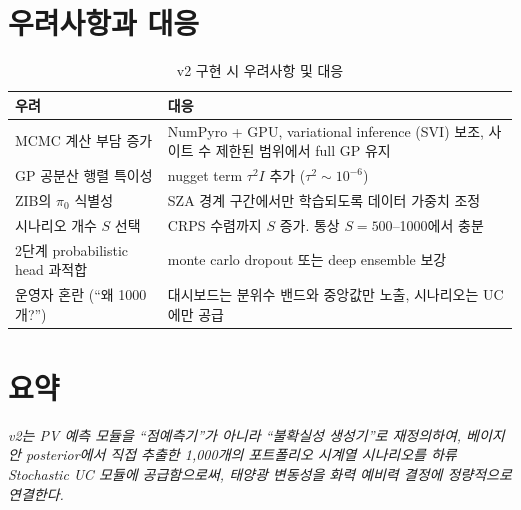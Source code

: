 \documentclass[11pt,a4paper]{article}
\begin{document}
\section{우려사항과 대응}

\begin{table}[H]
\centering
\small
\caption{v2 구현 시 우려사항 및 대응}
\begin{tabular}{p{4cm}p{9.5cm}}
\toprule
우려 & 대응 \\
\midrule
MCMC 계산 부담 증가 & NumPyro + GPU, variational inference (SVI) 보조, 사이트 수 제한된 범위에서 full GP 유지 \\
GP 공분산 행렬 특이성 & nugget term $\tau^2 I$ 추가 ($\tau^2\sim 10^{-6}$) \\
ZIB의 $\pi_0$ 식별성 & SZA 경계 구간에서만 학습되도록 데이터 가중치 조정 \\
시나리오 개수 $S$ 선택 & CRPS 수렴까지 $S$ 증가. 통상 $S=500$--1000에서 충분 \\
2단계 probabilistic head 과적합 & monte carlo dropout 또는 deep ensemble 보강 \\
운영자 혼란 (``왜 1000개?'') & 대시보드는 분위수 밴드와 중앙값만 노출, 시나리오는 UC에만 공급 \\
\bottomrule
\end{tabular}
\end{table}

\section{요약}

\begin{keybox}[v2의 한 문장 요약]
\textit{v2는 PV 예측 모듈을 ``점예측기''가 아니라 ``불확실성 생성기''로 재정의하여, 베이지안 posterior에서 직접 추출한 1,000개의 포트폴리오 시계열 시나리오를 하류 Stochastic UC 모듈에 공급함으로써, 태양광 변동성을 화력 예비력 결정에 정량적으로 연결한다.}
\end{keybox}
\end{document}
